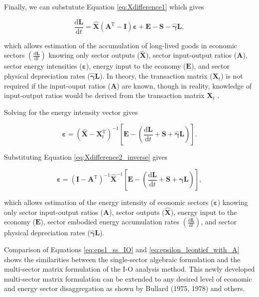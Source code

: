 \documentclass[authoryear,preprint,review,12pt]{elsarticle}
\let\oldhat\hat
\renewcommand{\vec}[1]{\mathbf{#1}}
\renewcommand{\hat}[1]{\oldhat{\mathbf{#1}}}
\begin{document}
\noindent Finally, we can substutute Equation \ref{eq:Xdifference1} which gives

\begin{equation} \label{eq:D-dB_dt_leontief_with_A}
	\frac{\mathrm{d}\vec{L}}{\mathrm{d}t} = \hat{\vec{X}} (\vec{A}^{\mathrm{T}} - \vec{I}) \vec{\varepsilon} + \vec{E} - \vec{S} - \hat{\vec{\gamma}}\vec{L},
\end{equation}

\noindent which allows estimation of the accumulation of long-lived goods in economic sectors $\left(\frac{\mathrm{d}\vec{L}}{\mathrm{d}t}\right)$ knowing only sector outputs ($\hat{\vec{X}}$), sector input-output ratios ($\vec{A}$), sector energy intensities ($\vec{\varepsilon}$), energy input to the economy ($\vec{E}$), and sector physical depreciation rates ($\hat{\vec{\gamma}}\vec{L}$). In theory, the transaction matrix ($\vec{X}_{t}$) is not required if the input-ouput ratios ($\vec{A}$) are known, though in reality, knowledge of input-output ratios would be derived from the transaction matrix $\vec{X}_{t}$ .

Solving for the energy intensity vector gives

\begin{equation} \label{eq:D-epsilon_leontief}
	\vec{\varepsilon} = (\hat{\vec{X}} - \vec{X}_{t}^{\mathrm{T}})^{-1}\left[\vec{E} - \left(\frac{\mathrm{d}\vec{L}}{\mathrm{d}t} + \vec{S} + \hat{\vec{\gamma}}\vec{L}\right)\right].
\end{equation}

\noindent Substituting Equation \ref{eq:Xdifference2_inverse} gives

\begin{equation} \label{eq:D-epsilon_leontief_with_A}
	\vec{\varepsilon} = (\vec{I} - \vec{A}^{\mathrm{T}})^{-1}\hat{\vec{X}}^{-1}\left[\vec{E} - \left(\frac{\mathrm{d}\vec{L}}{\mathrm{d}t} + \vec{S} + \hat{\vec{\gamma}}\vec{L}\right)\right],
\end{equation}

\noindent which allows estimation of the energy intensity of economic sectors ($\vec{\varepsilon}$) knowing only sector input-output ratios ($\vec{A}$), sector outputs ($\hat{\vec{X}}$), energy input to the economy ($\vec{E}$), sector embodied energy accumulation rates $\left(\frac{\mathrm{d}\vec{L}}{\mathrm{d}t}\right)$, and sector physical depreciation rates ($\hat{\vec{\gamma}}\vec{L}$).

Comparison of Equations \ref{eq:eps1_ss_IO} and \ref{eq:epsilon_leontief_with_A} shows the similarities between the single-sector algebraic formulation and the multi-sector matrix formulation of the I-O analysis method. This newly developed multi-sector matrix formulation can be extended to any desired level of economic and energy sector disaggregation as shown by Bullard (1975, 1978) and others.
\end{document}
